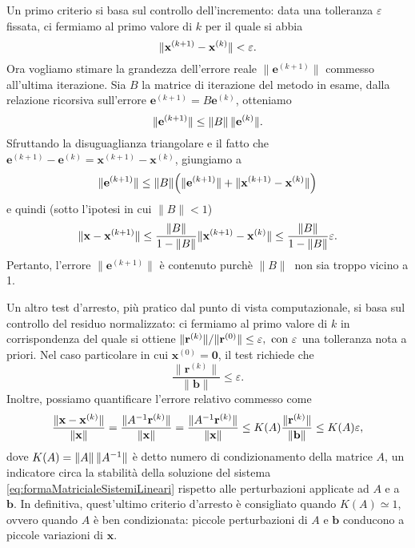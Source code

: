 Un primo criterio si basa sul controllo dell'incremento: data una tolleranza $\varepsilon$ fissata, ci fermiamo al primo valore di $k$ per il quale si abbia
\begin{equation*}
    \lVert\mathbf{x}^{(k+1)} - \mathbf{x}^{(k)}\rVert<\varepsilon.
\end{equation*}
Ora vogliamo stimare la grandezza dell'errore reale $\|\mathbf{e}^{(k+1)}\|$ commesso all'ultima iterazione.
Sia $B$ la matrice di iterazione del metodo in esame, dalla relazione ricorsiva sull'errore $\mathbf{e}^{(k+1)}= B\mathbf{e}^{(k)}$, otteniamo
\begin{equation}
    \lVert\mathbf{e}^{(k+1)}\rVert \le \lVert B\rVert\,\lVert\mathbf{e}^{(k)}\rVert.
\end{equation}
Sfruttando la disuguaglianza triangolare e il fatto che $\mathbf{e}^{(k+1)} - \mathbf{e}^{(k)} = \mathbf{x}^{(k+1)} - \mathbf{x}^{(k)}$, giungiamo a
\begin{equation*}
    \lVert\mathbf{e}^{(k+1)}\rVert \le \lVert B\rVert\Big(\lVert\mathbf{e}^{(k+1)}\rVert + \lVert\mathbf{x}^{(k+1)} - \mathbf{x}^{(k)}\rVert\Big)
\end{equation*}
e quindi (sotto l'ipotesi in cui $\|B\|<1$)
\begin{equation}
    \lVert\mathbf{x} - \mathbf{x}^{(k+1)}\rVert\le \frac{\lVert B\rVert}{1 - \lVert B\rVert}\lVert\mathbf{x}^{(k+1)} - \mathbf{x}^{(k)}\rVert \le  \frac{\lVert B\rVert}{1 - \lVert B\rVert} \varepsilon.
\end{equation}
Pertanto, l'errore  $\|\mathbf{e}^{(k+1)}\|$ \`e contenuto purch\`e $\|B\|\ $ non sia troppo vicino a 1.

Un altro test d'arresto, pi\`u pratico dal punto di vista computazionale, si basa sul controllo del residuo normalizzato: ci fermiamo al primo valore di $k$
in corrispondenza del quale si ottiene $\lVert\mathbf{r}^{(k)}\rVert/{\lVert\mathbf{r}^{(0)}\rVert} \le \varepsilon, \text{ con } \varepsilon$ una tolleranza nota a priori.\newline
Nel caso particolare in cui $\mathbf{x}^{(0)} = \mathbf{0}$, il test richiede che
\begin{equation*}
    \frac{\|\mathbf{r}^{(k)}\|}{\|\mathbf{b}\|} \le \varepsilon.
\end{equation*}
Inoltre, possiamo quantificare l'errore relativo commesso come
\begin{equation*}
    \frac{\lVert\mathbf{x}-\mathbf{x}^{(k)}\rVert}{\lVert\mathbf{x}\rVert} = \frac{\lVert A^{-1}\mathbf{r}^{(k)}\rVert}{\lVert\mathbf{x}\rVert} = \frac{\lVert A^{-1}\mathbf{r}^{(k)}\rVert}{\lVert\mathbf{x}\rVert} \le K(A) \frac{\lVert\mathbf{r}^{(k)}\rVert}{\lVert\mathbf{b}\rVert} \le K(A)\varepsilon,
\end{equation*}
dove $K(A)=\lVert A\rVert\,\lVert A^{-1}\rVert$ \`e detto numero di condizionamento della matrice $A$, un indicatore circa la stabilit\`a della soluzione del sistema \eqref{eq:formaMatricialeSistemiLineari} rispetto alle perturbazioni applicate ad $A$ e a $\mathbf{b}$.\newline
In definitiva, quest'ultimo criterio d'arresto \`e consigliato quando $K(A)\simeq 1$, ovvero quando $A$ \`e ben condizionata: piccole perturbazioni di $A \text{ e }\mathbf{b}$ conducono a piccole variazioni di $\mathbf{x}$.